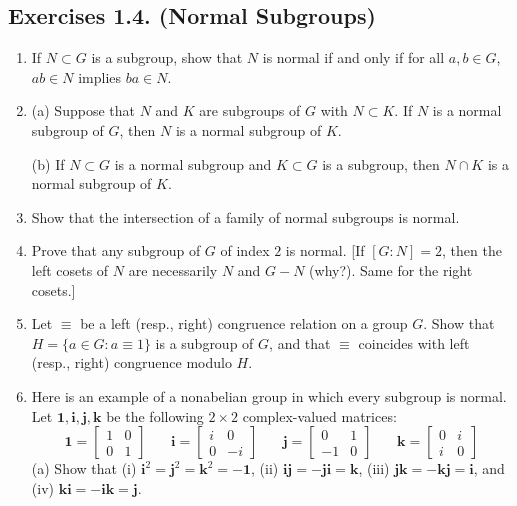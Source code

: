 \documentclass[leqno]{book}
\begin{document}
\subsection*{Exercises 1.4. (Normal Subgroups)}
\begin{enumerate}
\item If $N\subset G$ is a subgroup, show that $N$ is normal if and only if for all $a,b\in G$, $ab\in N$ implies $ba\in N$.

\item (a) Suppose that $N$ and $K$ are subgroups of $G$ with $N\subset K$.  If $N$ is a normal subgroup of $G$, then $N$ is a normal subgroup of $K$.

(b) If $N\subset G$ is a normal subgroup and $K\subset G$ is a subgroup, then $N\cap K$ is a normal subgroup of $K$.

\item Show that the intersection of a family of normal subgroups is normal.

\item Prove that any subgroup of $G$ of index $2$ is normal.  [If $[G:N]=2$, then the left cosets of $N$ are necessarily $N$ and $G-N$ (why?).  Same for the right cosets.]

\item Let $\equiv$ be a left (resp., right) congruence relation on a group $G$.  Show that $H=\{a\in G:a\equiv 1\}$ is a subgroup of $G$, and that $\equiv$ coincides with left (resp., right) congruence modulo $H$.

\item Here is an example of a nonabelian group in which every subgroup is normal.
Let $\mathbf 1,\mathbf i,\mathbf j,\mathbf k$ be the following $2\times 2$ complex-valued matrices:\\
$$\mathbf 1=\begin{bmatrix}1&0\\0&1\end{bmatrix}~~~~~~~~\mathbf i=\begin{bmatrix}i&0\\0&-i\end{bmatrix}~~~~~~~~\mathbf j=\begin{bmatrix}0&1\\-1&0\end{bmatrix}~~~~~~~~\mathbf k=\begin{bmatrix}0&i\\i&0\end{bmatrix}$$
(a) Show that (i) $\mathbf i^2=\mathbf j^2=\mathbf k^2=-\mathbf 1$, (ii) $\mathbf i\mathbf j=-\mathbf j\mathbf i=\mathbf k$, (iii) $\mathbf j\mathbf k=-\mathbf k\mathbf j=\mathbf i$, and (iv) $\mathbf k\mathbf i=-\mathbf i\mathbf k=\mathbf j$.


\end{enumerate}
\end{document}
